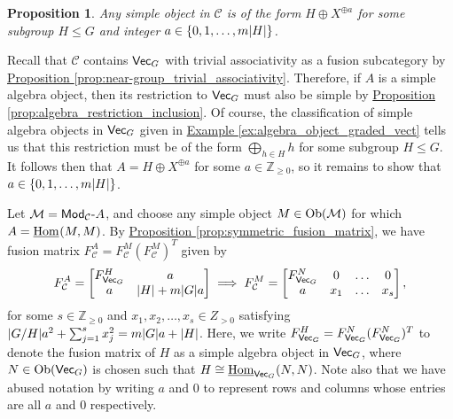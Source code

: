 \documentclass[12pt, reqno]{amsart}
\numberwithin{equation}{section}
\theoremstyle{plainspace}
\newtheorem{proposition}[theorem]{Proposition}
\theoremstyle{definitionspace}
\theoremstyle{remarkspace}
\renewenvironment{proof}{{\noindent\textbf{Proof.}}}{\null\hfill\qedsymbol}
\DeclarePairedDelimiter{\abs}{\lvert}{\rvert}
\newcommand{\mathcat}[1]{\mathcal{#1}}
\newcommand{\Ob}{\textup{Ob}}
\newcommand{\IntHom}[2][]{
	\ifthenelse{\equal{#2}{}}
		{\underline{\textup{Hom}}_{#1}}
		{\underline{\textup{Hom}}_{#1}\!\left(#2\right)}
}
\newcommand{\textcat}[1]{\textup{\textsf{#1}}}
\newcommand{\rmodcat}[2][]{\textcat{Mod}_{#1}\textcat{-}#2}
\begin{document}
\begin{proposition}\label{prop:near-group_algebra_candidates}
Any simple object in $\mathcat{C}$ is of the form $H \oplus X^{\oplus a}$ for some subgroup $H \leq G$ and integer $a \in \{0, 1, \dots, m\abs{H}\}$.
\end{proposition}
\leavevmode\newline
\begin{proof}
\noindent Recall that $\mathcat{C}$ contains $\textcat{Vec}_G$ with trivial associativity as a fusion subcategory by \hyperref[prop:near-group_trivial_associativity]{Proposition \ref*{prop:near-group_trivial_associativity}}. Therefore, if $A$ is a simple algebra object, then its restriction to $\textcat{Vec}_G$ must also be simple by \hyperref[prop:algebra_restriction_inclusion]{Proposition \ref*{prop:algebra_restriction_inclusion}}. Of course, the classification of simple algebra objects in $\textcat{Vec}_G$ given in \hyperref[ex:algebra_object_graded_vect]{Example \ref*{ex:algebra_object_graded_vect}} tells us that this restriction must be of the form $\bigoplus_{h \in H}{h}$ for some subgroup $H \leq G$. It follows then that $A = H \oplus X^{\oplus a}$ for some $a \in \mathbb{Z}_{\geq 0}$, so it remains to show that $a \in \{0, 1, \dots, m\abs{H}\}$.
\newline

\noindent Let $\mathcat{M} = \rmodcat[\mathcat{C}]{A}$, and choose any simple object $M \in \Ob(\mathcat{M})$ for which $A = \IntHom{M, M}$. By \hyperref[prop:symmetric_fusion_matrix]{Proposition \ref*{prop:symmetric_fusion_matrix}}, we have fusion matrix $F_{\mathcat{C}}^A = F_{\mathcat{C}}^M (F_{\mathcat{C}}^M)^T$ given by
\begin{align*}
\begin{split}
F_{\mathcat{C}}^A = \begin{bmatrix}
F_{\textcat{Vec}_G}^H & a \\
a & \abs{H} + m\abs{G}a
\end{bmatrix} \implies F_{\mathcat{C}}^M = \begin{bmatrix}
F_{\textcat{Vec}_G}^N & 0 & \dots & 0 \\
a & x_1 & \dots & x_s
\end{bmatrix},
\end{split}
\end{align*}
\noindent for some $s \in \mathbb{Z}_{\geq 0}$ and $x_1, x_2, \dots, x_s \in Z_{>0}$ satisfying $\abs{G/H}a^2 + \sum_{j=1}^{s}{x_j^2} = m\abs{G}a + \abs{H}$. Here, we write $F_{\textcat{Vec}_G}^H = F_{\textcat{Vec}_G}^N(F_{\textcat{Vec}_G}^N)^T$ to denote the fusion matrix of $H$ as a simple algebra object in $\textcat{Vec}_G$, where $N \in \Ob(\textcat{Vec}_G)$ is chosen such that $H \cong \IntHom[\textcat{Vec}_G]{N, N}$. Note also that we have abused notation by writing $a$ and $0$ to represent rows and columns whose entries are all $a$ and $0$ respectively.
\newline


\end{proof}
\end{document}
